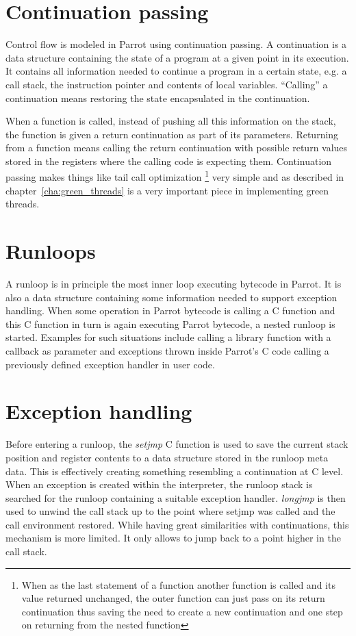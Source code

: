 \documentclass[bachelor,english]{hgbthesis}
\begin{document}
\section{Continuation passing}

Control flow is modeled in Parrot using continuation passing. A continuation is a data structure containing the state of a program at a given point in its execution. It contains all information needed to continue a program in a certain state, e.g. a call stack, the instruction pointer and contents of local variables. ``Calling'' a continuation means restoring the state encapsulated in the continuation.

When a function is called, instead of pushing all this information on the stack, the function is given a return continuation as part of its parameters. Returning from a function means calling the return continuation with possible return values stored in the registers where the calling code is expecting them. Continuation passing makes things like tail call optimization \footnote{When as the last statement of a function another function is called and its value returned unchanged, the outer function can just pass on its return continuation thus saving the need to create a new continuation and one step on returning from the nested function} very simple and as described in chapter~\ref{cha:green_threads} is a very important piece in implementing green threads.

\section{Runloops}
\label{sec:Runloops}

A runloop is in principle the most inner loop executing bytecode in Parrot. It is also a data structure containing some information needed to support exception handling. When some operation in Parrot bytecode is calling a C function and this C function in turn is again executing Parrot bytecode, a nested runloop is started. Examples for such situations include calling a library function with a callback as parameter and exceptions thrown inside Parrot's C code calling a previously defined exception handler in user code.

\section{Exception handling}

Before entering a runloop, the \textit{setjmp} C function is used to save the current stack position and register contents to a data structure stored in the runloop meta data. This is effectively creating something resembling a continuation at C level. When an exception is created within the interpreter, the runloop stack is searched for the runloop containing a suitable exception handler. \textit{longjmp} is then used to unwind the call stack up to the point where setjmp was called and the call environment restored. While having great similarities with continuations, this mechanism is more limited. It only allows to jump back to a point higher in the call stack.
\end{document}
